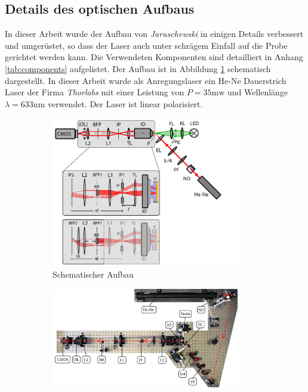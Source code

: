 \documentclass[titlepage]{article}
\begin{document}
	\subsection{Details des optischen Aufbaus}
	In dieser Arbeit wurde der Aufbau von \textit{Jaruschewski} \cite{Jaruschewski.2020} in einigen Details verbessert und umgerüstet, so dass der Laser auch unter schrägem Einfall auf die Probe gerichtet werden kann. Die Verwendeten Komponenten sind detailliert in Anhang \ref{tab:components} aufgelistet. Der Aufbau ist in Abbildung \ref{fig:aufbau_schema} schematisch dargestellt. In dieser Arbeit wurde als Anregungslaser ein He-Ne Dauerstrich Laser der Firma \textit{Thorlabs} mit einer Leistung von $P = 35\mathrm{mw}$ und Wellenlänge $\lambda = 633\mathrm{nm}$ verwendet. Der Laser ist linear polarisiert.
	\begin{figure}
		\centering
		\begin{subfigure}[b]{0.9\textwidth}		
			\centering
			\includegraphics[width=0.9\textwidth]{figures/Aufbau_Schema.pdf}
			\caption{Schematischer Aufbau}			
			\label{fig:aufbau_schema}
		\end{subfigure}
		\vfil
		\begin{subfigure}[b]{0.9\textwidth} 
			\centering
			\includegraphics[width=0.9\textwidth]{figures/aufsicht_aufbau_anotated.jpg}

\end{subfigure}
\end{figure}
\end{document}
